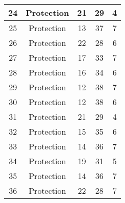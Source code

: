 \documentclass[results.tex]{subfiles}
\begin{document}
\begin{center}
\begin{tabular}{| c || c | c | c | c |}
            \hline
            24                      & Protection                   & 21                     & 29                      & 4                    \\
            \hline
            25                      & Protection                   & 13                     & 37                      & 7                    \\
            \hline
            26                      & Protection                   & 22                     & 28                      & 6                    \\
            \hline
            27                      & Protection                   & 17                     & 33                      & 7                    \\
            \hline
            28                      & Protection                   & 16                     & 34                      & 6                    \\
            \hline
            29                      & Protection                   & 12                     & 38                      & 7                    \\
            \hline
            30                      & Protection                   & 12                     & 38                      & 6                    \\
            \hline
            31                      & Protection                   & 21                     & 29                      & 4                    \\
            \hline
            32                      & Protection                   & 15                     & 35                      & 6                    \\
            \hline
            33                      & Protection                   & 14                     & 36                      & 7                    \\
            \hline
            34                      & Protection                   & 19                     & 31                      & 5                    \\
            \hline
            35                      & Protection                   & 14                     & 36                      & 7                    \\
            \hline
            36                      & Protection                   & 22                     & 28                      & 7                    \\

\end{tabular}
\end{center}
\end{document}
